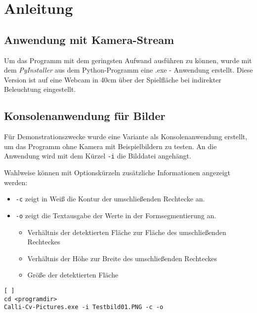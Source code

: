 
\section{Anleitung}
\label{sec:Anleitung}

\subsection{Anwendung mit Kamera-Stream}
Um das Programm mit dem geringsten Aufwand ausführen zu können, wurde mit dem \emph{PyInstaller} aus dem Python-Programm eine .exe - Anwendung erstellt. Diese Version ist auf eine Webcam in 40cm über der Spielfläche bei indirekter Beleuchtung eingestellt. 


\subsection{Konsolenanwendung für Bilder}
Für Demonstrationszwecke wurde eine Variante als Konsolenanwendung erstellt, um das Programm ohne Kamera mit Beispielbildern zu testen. 
An die Anwendung wird mit dem Kürzel \lstinline{-i} die Bilddatei angehängt.
 
Wahlweise können mit Optionskürzeln zusätzliche Informationen angezeigt werden:
\begin{itemize}
\item \lstinline{-c} zeigt in Weiß die Kontur der umschließenden Rechtecke an. 
\item \lstinline{-o} zeigt die Textausgabe der Werte in der Formsegmentierung an.
\begin{itemize}
\item Verhältnis der detektierten Fläche zur Fläche des umschließenden Rechteckes
\item Verhältnis der Höhe zur Breite des umschließenden Rechteckes
\item Größe der detektierten Fläche
\end{itemize}
\end{itemize}
\begin{lstlisting}[ ]
cd <programdir>
Calli-Cv-Pictures.exe -i Testbild01.PNG -c -o
\end{lstlisting}

